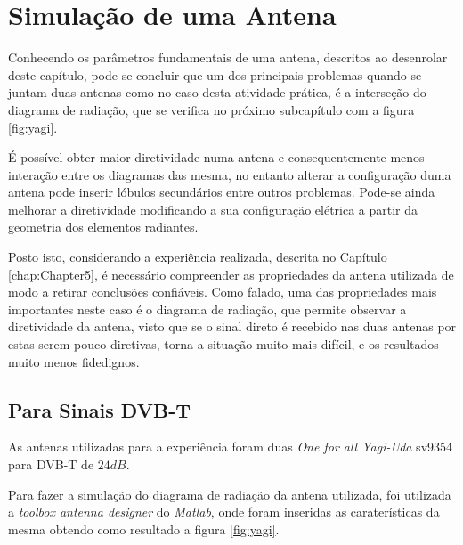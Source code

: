 \section{Simulação de uma Antena}
Conhecendo os parâmetros fundamentais de uma antena, descritos ao desenrolar deste capítulo, pode-se concluir que um dos principais problemas quando se juntam duas antenas como no caso desta atividade prática, é a interseção do diagrama de radiação, que se verifica no próximo subcapítulo com a figura \ref{fig:yagi}.\par
É possível obter maior diretividade numa antena e consequentemente menos interação entre os diagramas das mesma, no entanto alterar a configuração duma antena pode inserir lóbulos secundários entre outros problemas. Pode-se ainda melhorar a diretividade modificando a sua configuração elétrica a partir da geometria dos elementos radiantes.\par
Posto isto, considerando a experiência realizada, descrita no Capítulo \ref{chap:Chapter5}, é necessário compreender as propriedades da antena utilizada de modo a retirar conclusões confiáveis. Como falado, uma das propriedades mais importantes neste caso é o diagrama de radiação, que permite observar a diretividade da antena, visto que se o sinal direto é recebido nas duas antenas por estas serem pouco diretivas, torna a situação muito mais difícil, e os resultados muito menos fidedignos.

\subsection{Para Sinais DVB-T}
As antenas utilizadas para a experiência foram duas \textit{One for all Yagi-Uda} sv9354 para \gls{DVB-T} de $24 dB$.\par 
Para fazer a simulação do diagrama de radiação da antena utilizada, foi utilizada a \textit{toolbox antenna designer} do \textit{Matlab}, onde foram inseridas as caraterísticas da mesma obtendo como resultado a figura \ref{fig:yagi}. 

